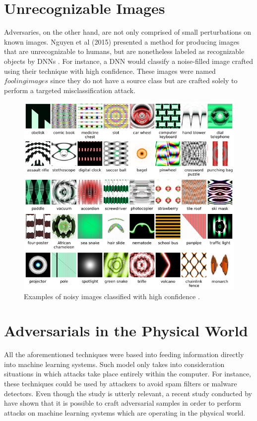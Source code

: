\section{Unrecognizable Images}\label{subsec:unrec}

Adversaries, on the other hand, are not only comprised of small perturbations on known images. Nguyen et al (2015) presented a method for producing images that are unrecognizable to humans, but are nonetheless labeled as recognizable objects by DNNs \cite{nguyen2015}. For instance, a DNN would classify a noise-filled image crafted using their technique with high confidence. These images were named $fooling images$ since they do not have a source class but are crafted solely to perform a targeted misclassification attack.

\begin{figure}[!h]
\centering
	\includegraphics[scale=1.]{unrec_images.png}
\caption{Examples of noisy images classified with high confidence \cite{nguyen2015}.}
\label{fig:unrec_images}
\end{figure}


\section{Adversarials in the Physical World}\label{sec:physical}

All the aforementioned techniques were based into feeding information directly into machine learning systems. Such model only takes into consideration situations in which attacks take place entirely within the computer. For instance, these techniques could be used by attackers to avoid spam filters or malware detectors. Even though the study is utterly relevant, a recent study conducted by \cite{goodfellow2016} have shown that it is possible to craft adversarial samples in order to perform attacks on machine learning systems which are operating in the physical world.

